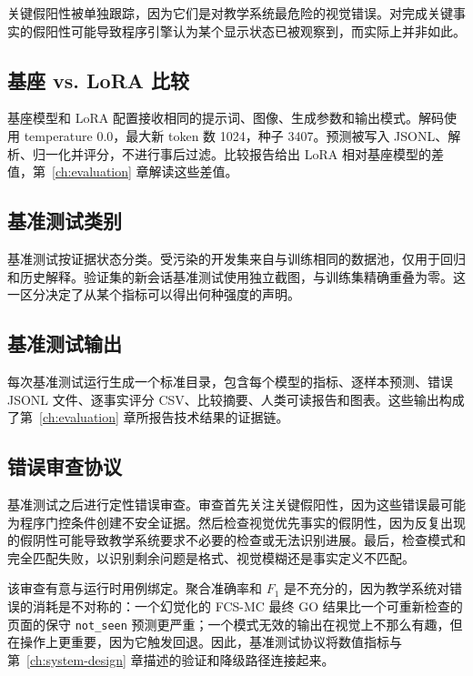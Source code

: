 关键假阳性被单独跟踪，因为它们是对教学系统最危险的视觉错误。对完成关键事实的假阳性可能导致程序引擎认为某个显示状态已被观察到，而实际上并非如此。

\subsection{基座 vs. LoRA 比较}

基座模型和 LoRA 配置接收相同的提示词、图像、生成参数和输出模式。解码使用 temperature 0.0，最大新 token 数 1024，种子 3407。预测被写入 JSONL、解析、归一化并评分，不进行事后过滤。比较报告给出 LoRA 相对基座模型的差值，第~\ref{ch:evaluation} 章解读这些差值。

\subsection{基准测试类别}

基准测试按证据状态分类。受污染的开发集来自与训练相同的数据池，仅用于回归和历史解释。验证集的新会话基准测试使用独立截图，与训练集精确重叠为零。这一区分决定了从某个指标可以得出何种强度的声明。

\subsection{基准测试输出}

每次基准测试运行生成一个标准目录，包含每个模型的指标、逐样本预测、错误 JSONL 文件、逐事实评分 CSV、比较摘要、人类可读报告和图表。这些输出构成了第~\ref{ch:evaluation} 章所报告技术结果的证据链。

\subsection{错误审查协议}

基准测试之后进行定性错误审查。审查首先关注关键假阳性，因为这些错误最可能为程序门控条件创建不安全证据。然后检查视觉优先事实的假阴性，因为反复出现的假阴性可能导致教学系统要求不必要的检查或无法识别进展。最后，检查模式和完全匹配失败，以识别剩余问题是格式、视觉模糊还是事实定义不匹配。

该审查有意与运行时用例绑定。聚合准确率和 \(F_1\) 是不充分的，因为教学系统对错误的消耗是不对称的：一个幻觉化的 FCS-MC 最终 GO 结果比一个可重新检查的页面的保守 \texttt{not\_seen} 预测更严重；一个模式无效的输出在视觉上不那么有趣，但在操作上更重要，因为它触发回退。因此，基准测试协议将数值指标与第~\ref{ch:system-design} 章描述的验证和降级路径连接起来。

